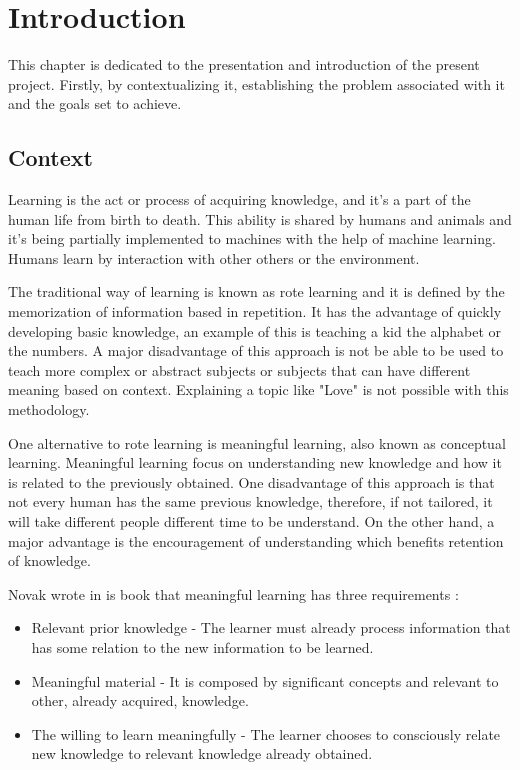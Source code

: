 %
\chapter{Introduction} %
\label{chap:Chapter1} %

This chapter is dedicated to the presentation and introduction of the present project.
Firstly, by contextualizing it, establishing the problem associated with it and the goals set to achieve.

\section{Context}

Learning is the act or process of acquiring knowledge, and it's a part of the human life from birth to death.
This ability is shared by humans and animals and it's being partially implemented to machines with the help of machine learning.
Humans learn by interaction with other others or the environment.

The traditional way of learning is known as rote learning and it is defined by the memorization of information based in repetition.
It has the advantage of quickly developing basic knowledge, an example of this is teaching a kid the alphabet or the numbers.
A major disadvantage of this approach is not be able to be used to teach more complex or abstract subjects or subjects that can have different meaning based on context.
Explaining a topic like "Love" is not possible with this methodology.

One alternative to rote learning is meaningful learning, also known as conceptual learning.
Meaningful learning focus on understanding new knowledge and how it is related to the previously obtained.
One disadvantage of this approach is that not every human has the same previous knowledge, therefore, if not tailored, it will take different people different time to be understand.
On the other hand, a major advantage is the encouragement of understanding which benefits retention of knowledge.

Novak wrote in is book\cite{novak2010learning} that meaningful learning has three requirements :

\begin{itemize}
    \item Relevant prior knowledge - The learner must already process information that has some relation to the new information to be learned.
    \item Meaningful material - It is composed by significant concepts and relevant to other, already acquired, knowledge.
    \item The willing to learn meaningfully - The learner chooses to consciously relate new knowledge to relevant knowledge already obtained.
\end{itemize}

